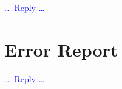 \documentclass[a4paper,11pt,hidelinks]{article}
\renewcommand{\todo}[1]{\textcolor{blue}{#1}} %
\begin{document}

\todo{\dots\ Reply \dots}



\section*{Error Report}


\todo{\dots\ Reply \dots}



% 
% 

\end{document}
